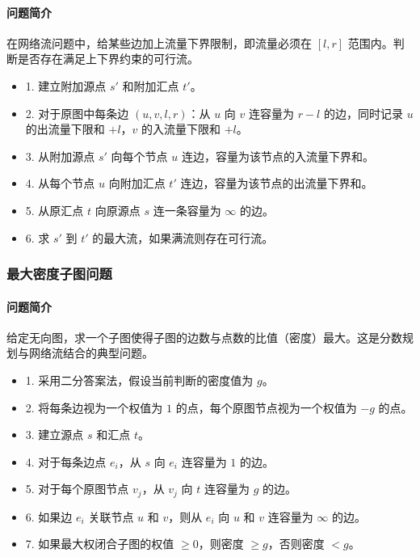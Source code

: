 \paragraph{问题简介}
在网络流问题中，给某些边加上流量下界限制，即流量必须在 $[l, r]$ 范围内。判断是否存在满足上下界约束的可行流。

\begin{itemize}
    \item 1. 建立附加源点 $s'$ 和附加汇点 $t'$。
    \item 2. 对于原图中每条边 $(u,v,l,r)$：从 $u$ 向 $v$ 连容量为 $r-l$ 的边，同时记录 $u$ 的出流量下限和 $+l$，$v$ 的入流量下限和 $+l$。
    \item 3. 从附加源点 $s'$ 向每个节点 $u$ 连边，容量为该节点的入流量下界和。
    \item 4. 从每个节点 $u$ 向附加汇点 $t'$ 连边，容量为该节点的出流量下界和。
    \item 5. 从原汇点 $t$ 向原源点 $s$ 连一条容量为 $\infty$ 的边。
    \item 6. 求 $s'$ 到 $t'$ 的最大流，如果满流则存在可行流。
\end{itemize}

\subsubsection{最大密度子图问题}
\paragraph{问题简介}
给定无向图，求一个子图使得子图的边数与点数的比值（密度）最大。这是分数规划与网络流结合的典型问题。

\begin{itemize}
    \item 1. 采用二分答案法，假设当前判断的密度值为 $g$。
    \item 2. 将每条边视为一个权值为 $1$ 的点，每个原图节点视为一个权值为 $-g$ 的点。
    \item 3. 建立源点 $s$ 和汇点 $t$。
    \item 4. 对于每条边点 $e_i$，从 $s$ 向 $e_i$ 连容量为 $1$ 的边。
    \item 5. 对于每个原图节点 $v_j$，从 $v_j$ 向 $t$ 连容量为 $g$ 的边。
    \item 6. 如果边 $e_i$ 关联节点 $u$ 和 $v$，则从 $e_i$ 向 $u$ 和 $v$ 连容量为 $\infty$ 的边。
    \item 7. 如果最大权闭合子图的权值 $\geq 0$，则密度 $\geq g$，否则密度 $< g$。
\end{itemize}
